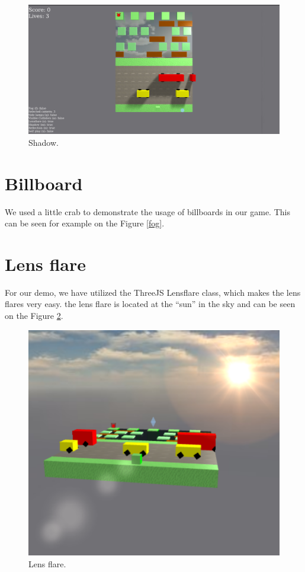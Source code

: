 \documentclass[a4paper,10pt, twocolumn]{article}
\begin{document}
\begin{figure}[!htb]
	\centering
	\includegraphics[width=\linewidth]{images/shadows.png}
  	\caption{Shadow.}
	\label{shadow}
\end{figure}

\section{Billboard}
We used a little crab to demonstrate the usage of billboards in our game. This can be seen for example on the Figure \ref{fog}.

\section{Lens flare}
For our demo, we have utilized the ThreeJS Lensflare class, which makes the lens flares very easy. the lens flare is located at the ``sun'' in the sky and can be seen on the Figure \ref{lensflare}.

\begin{figure}[!htb]
	\centering
	\includegraphics[width=\linewidth]{images/lensflare.png}
	\caption{Lens flare.}
	\label{lensflare}
\end{figure}
\end{document}
